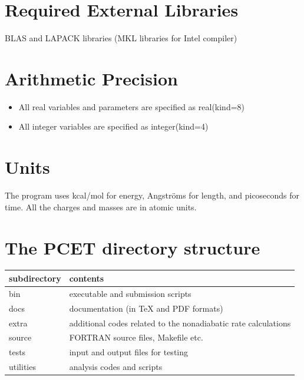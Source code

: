 \documentclass[oneside,11pt,openany]{book}
\newcommand{\tw}{\ttfamily}
\begin{document}
\section{Required External Libraries}
BLAS and LAPACK libraries (MKL libraries for Intel compiler)

\section{Arithmetic Precision}
\begin{itemize}
\item All real variables and parameters are specified as {\tw real(kind=8)}
\item All integer variables are specified as {\tw integer(kind=4)}
\end{itemize}

\section{Units}
The program uses kcal/mol for energy, Angstr\"oms for length, and picoseconds
for time. All the charges and masses are in atomic units.

\section{The PCET directory structure}
\begin{tabular}{ll}
subdirectory & contents \\ \hline
{\tw bin}       & executable and submission scripts \\
{\tw docs}      & documentation (in TeX and PDF formats) \\
{\tw extra}     & additional codes related to the nonadiabatic rate calculations \\
{\tw source}    & FORTRAN source files, {\tw Makefile} etc. \\
{\tw tests}     & input and output files for testing \\
{\tw utilities} & analysis codes and scripts \\ \hline
\end{tabular}

\end{document}
